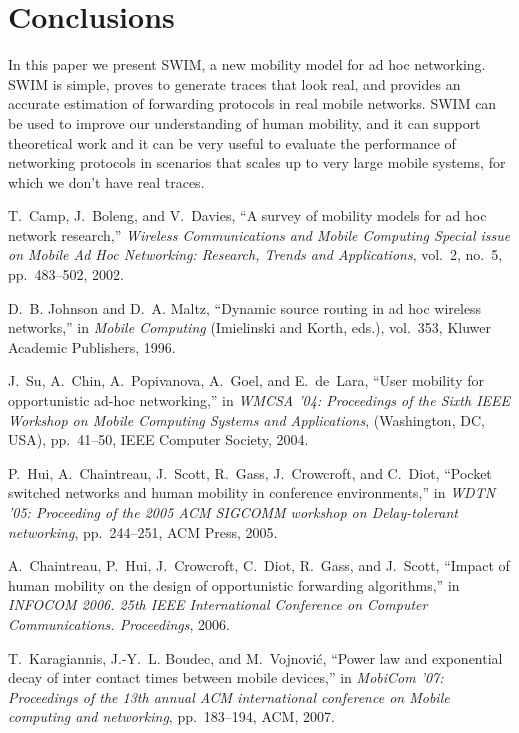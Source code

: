\documentclass[conference]{IEEEtran}
\begin{document}
\section{Conclusions}
\label{sec:conclusions}
In this paper we present SWIM, a new mobility model for ad hoc networking. SWIM
is simple, proves to generate traces that look real, and provides an accurate
estimation of forwarding protocols in real mobile networks. SWIM can be used to
improve our understanding of human mobility, and it can support theoretical work
and it can be very useful to evaluate the performance of networking protocols in
scenarios that scales up to very large mobile systems, for which we don't have
real traces.

\begin{thebibliography}{10}

T.~Camp, J.~Boleng, and V.~Davies, ``A survey of mobility models for ad hoc
  network research,'' {\em Wireless Communications and Mobile Computing Special
  issue on Mobile Ad Hoc Networking: Research, Trends and Applications},
  vol.~2, no.~5, pp.~483--502, 2002.

D.~B. Johnson and D.~A. Maltz, ``Dynamic source routing in ad hoc wireless
  networks,'' in {\em Mobile Computing} (Imielinski and Korth, eds.), vol.~353,
  Kluwer Academic Publishers, 1996.

J.~Su, A.~Chin, A.~Popivanova, A.~Goel, and E.~de~Lara, ``User mobility for
  opportunistic ad-hoc networking,'' in {\em WMCSA '04: Proceedings of the
  Sixth IEEE Workshop on Mobile Computing Systems and Applications},
  (Washington, DC, USA), pp.~41--50, IEEE Computer Society, 2004.

P.~Hui, A.~Chaintreau, J.~Scott, R.~Gass, J.~Crowcroft, and C.~Diot, ``Pocket
  switched networks and human mobility in conference environments,'' in {\em
  WDTN '05: Proceeding of the 2005 ACM SIGCOMM workshop on Delay-tolerant
  networking}, pp.~244--251, ACM Press, 2005.

A.~Chaintreau, P.~Hui, J.~Crowcroft, C.~Diot, R.~Gass, and J.~Scott, ``Impact
  of human mobility on the design of opportunistic forwarding algorithms,'' in
  {\em INFOCOM 2006. 25th IEEE International Conference on Computer
  Communications. Proceedings}, 2006.

T.~Karagiannis, J.-Y.~L. Boudec, and M.~Vojnovi\'{c}, ``Power law and
  exponential decay of inter contact times between mobile devices,'' in {\em
  MobiCom '07: Proceedings of the 13th annual ACM international conference on
  Mobile computing and networking}, pp.~183--194, ACM, 2007.


\end{thebibliography}
\end{document}
